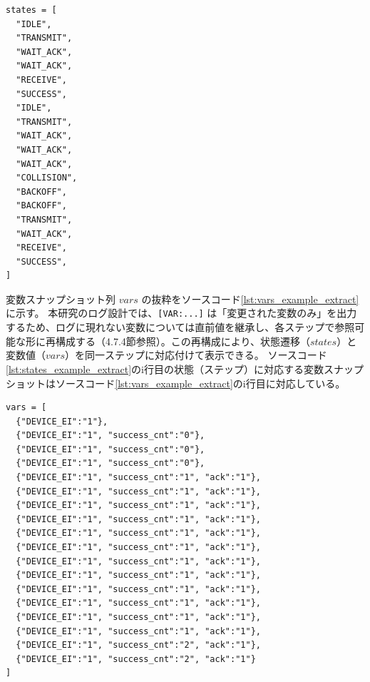 \documentclass[12pt]{jreport}
\begin{document}
\begin{lstlisting}[caption=ログ解析結果の例（states の抜粋）,label=lst:states_example_extract]
states = [
  "IDLE",
  "TRANSMIT",
  "WAIT_ACK",
  "WAIT_ACK",
  "RECEIVE",
  "SUCCESS",
  "IDLE",
  "TRANSMIT",
  "WAIT_ACK",
  "WAIT_ACK",
  "WAIT_ACK",
  "COLLISION",
  "BACKOFF",
  "BACKOFF",
  "TRANSMIT",
  "WAIT_ACK",
  "RECEIVE",
  "SUCCESS",
]
\end{lstlisting}

\begin{par}
変数スナップショット列 $vars$ の抜粋をソースコード\ref{lst:vars_example_extract}に示す。
本研究のログ設計では、\verb|[VAR:...]| は「変更された変数のみ」を出力するため、ログに現れない変数については直前値を継承し、各ステップで参照可能な形に再構成する（4.7.4節参照）。この再構成により、状態遷移（$states$）と変数値（$vars$）を同一ステップに対応付けて表示できる。
ソースコード\ref{lst:states_example_extract}のi行目の状態（ステップ）に対応する変数スナップショットはソースコード\ref{lst:vars_example_extract}のi行目に対応している。
\end{par}

\begin{lstlisting}[caption=ログ解析結果の例（vars の抜粋）,label=lst:vars_example_extract]
vars = [
  {"DEVICE_EI":"1"},
  {"DEVICE_EI":"1", "success_cnt":"0"},
  {"DEVICE_EI":"1", "success_cnt":"0"},
  {"DEVICE_EI":"1", "success_cnt":"0"},
  {"DEVICE_EI":"1", "success_cnt":"1", "ack":"1"},
  {"DEVICE_EI":"1", "success_cnt":"1", "ack":"1"},
  {"DEVICE_EI":"1", "success_cnt":"1", "ack":"1"},
  {"DEVICE_EI":"1", "success_cnt":"1", "ack":"1"},
  {"DEVICE_EI":"1", "success_cnt":"1", "ack":"1"},
  {"DEVICE_EI":"1", "success_cnt":"1", "ack":"1"},
  {"DEVICE_EI":"1", "success_cnt":"1", "ack":"1"},
  {"DEVICE_EI":"1", "success_cnt":"1", "ack":"1"},
  {"DEVICE_EI":"1", "success_cnt":"1", "ack":"1"},
  {"DEVICE_EI":"1", "success_cnt":"1", "ack":"1"},
  {"DEVICE_EI":"1", "success_cnt":"1", "ack":"1"},
  {"DEVICE_EI":"1", "success_cnt":"1", "ack":"1"},
  {"DEVICE_EI":"1", "success_cnt":"2", "ack":"1"},
  {"DEVICE_EI":"1", "success_cnt":"2", "ack":"1"}
]
\end{lstlisting}


\end{document}
